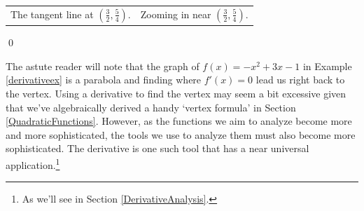 \documentclass{ximera}
\begin{document}
\begin{example}
\begin{enumerate}
\begin{center}
\begin{tabular}{cc}
 The tangent line at  $\left(\frac{3}{2}, \frac{5}{4} \right)$. & Zooming in near $\left(\frac{3}{2}, \frac{5}{4} \right)$.  \\
 
 \end{tabular}
 
 \end{center}
 
 \hfill \qed


\end{enumerate}

\end{example}

The astute reader will note that the graph of $f(x) = -x^2+3x-1$ in Example \ref{derivativeex} is a parabola and finding where $f'(x) = 0$ lead us right back to the vertex.  Using a derivative to find the vertex may seem a bit excessive given that we've algebraically derived a handy `vertex formula' in Section \ref{QuadraticFunctions}.   However, as the functions we aim to analyze become more and more sophisticated, the tools we use to analyze them must also become more sophisticated.  The derivative is one such tool that has a near universal application.\footnote{As we'll see in Section \ref{DerivativeAnalysis}.}

\medskip
\end{document}
